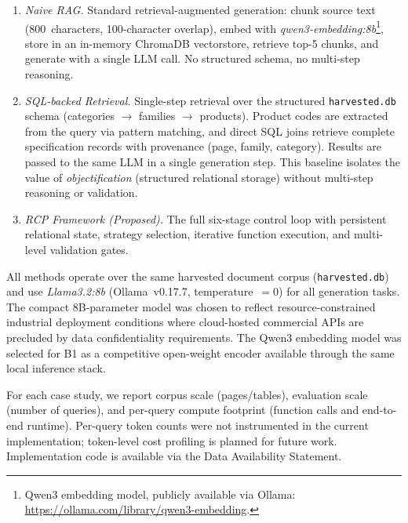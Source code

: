 \documentclass[largeformat]{interact}
\begin{document}
\begin{enumerate}[label=\textit{B\arabic*:}, leftmargin=3.5em]
    \item \textit{Naive RAG.} Standard retrieval-augmented generation: chunk source text (800~characters, 100-character overlap), embed with \textit{qwen3-embedding:8b}\footnote{Qwen3 embedding model, publicly available via Ollama: \url{https://ollama.com/library/qwen3-embedding}.}, store in an in-memory ChromaDB vectorstore, retrieve top-5 chunks, and generate with a single LLM call. No structured schema, no multi-step reasoning.
    \item \textit{SQL-backed Retrieval.} Single-step retrieval over the structured \texttt{harvested.db} schema (categories $\rightarrow$ families $\rightarrow$ products). Product codes are extracted from the query via pattern matching, and direct SQL joins retrieve complete specification records with provenance (page, family, category). Results are passed to the same LLM in a single generation step. This baseline isolates the value of \emph{objectification} (structured relational storage) without multi-step reasoning or validation.
    \item \textit{RCP Framework (Proposed).} The full six-stage control loop with persistent relational state, strategy selection, iterative function execution, and multi-level validation gates.
\end{enumerate}

All methods operate over the same harvested document corpus (\texttt{harvested.db}) and use \emph{Llama3.2:8b} (Ollama~v0.17.7, temperature~$= 0$) for all generation tasks. The compact 8B-parameter model was chosen to reflect resource-constrained industrial deployment conditions where cloud-hosted commercial APIs are precluded by data confidentiality requirements. The Qwen3 embedding model was selected for B1 as a competitive open-weight encoder available through the same local inference stack.

For each case study, we report corpus scale (pages/tables), evaluation scale (number of queries), and per-query compute footprint (function calls and end-to-end runtime). Per-query token counts were not instrumented in the current implementation; token-level cost profiling is planned for future work. Implementation code is available via the Data Availability Statement.

\end{document}
